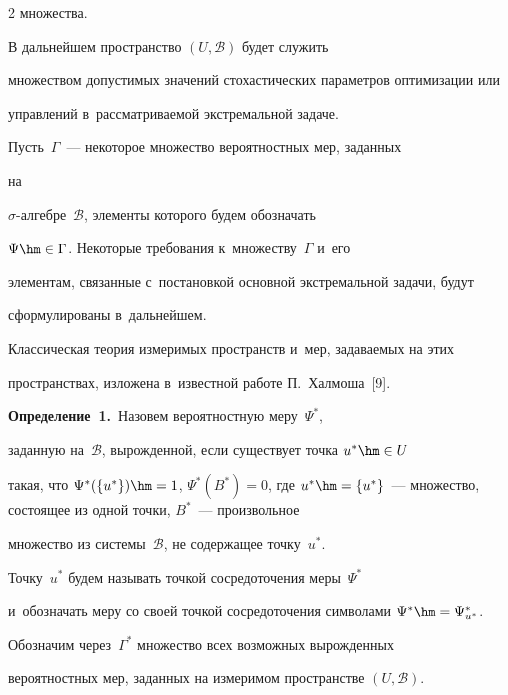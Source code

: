 \begin{multicols}{2}
множества.

     

     В дальнейшем пространство $(U,\mathcal{B})$ будет служить 

множеством допустимых значений стохастических параметров оптимизации или 

управлений в~рас\-смат\-ри\-ва\-емой экстремальной задаче.

     

     Пусть~$\Gamma$~--- некоторое множество вероятностных мер, заданных 

на  

$\sigma$-ал\-геб\-ре~$\mathcal{B}$, элементы которого будем обозначать 

$\Psi\hm\in\Gamma$. Некоторые требования к~множеству~$\Gamma$ и~его 

элементам, связанные с~постановкой основной экстремальной задачи, будут 

сформулированы в~дальнейшем.

      

     Классическая теория измеримых пространств и~мер, за\-да\-ва\-емых на этих 

пространствах, изложена в~известной работе П.~Халмоша~[9].

     

     \smallskip

     

     \noindent

     \textbf{Определение~1.}\ Назовем вероятностную меру~$\Psi^*$, 

заданную на~$\mathcal{B}$, вырожденной, если существует точка $u^*\hm\in U$ 

такая, что $\Psi^*(\{u^*\})\hm=1$, $\Psi^*(B^*)=0$, где $u^*\hm= \{ 

u^*\}$~--- множество, со\-сто\-ящее из одной точ\-ки, $B^*$~--- произвольное 

множество из системы~$\mathcal{B}$, не содержащее точку~$u^*$. 

Точку~$u^*$ будем называть точ\-кой сосредоточения меры~$\Psi^*$ 

и~обозначать меру со своей точ\-кой сосредоточения символами $\Psi^*\hm= 

\Psi^*_{u^*}$.

     

     Обозначим через~$\Gamma^*$ множество всех возможных вырожденных 

вероятностных мер, заданных на измеримом пространстве $(U,\mathcal{B})$. 


\end{multicols}
